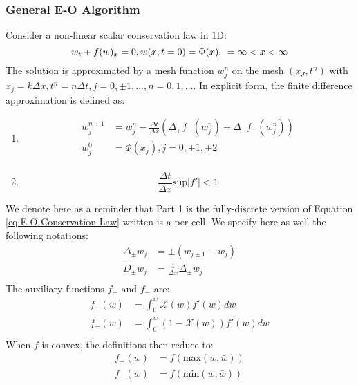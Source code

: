 \documentclass[a4paper]{article}
\numberwithin{equation}{section}
\begin{document}
\subsubsection{General E-O Algorithm}
Consider a non-linear scalar conservation law in 1D:
\begin{equation} 
    w_t + f(w)_x = 0,\\ w(x,t=0) = \Phi(x). \ =\infty < x< \infty
\end{equation}
The solution is approximated by a mesh function $w_j^n$ on the mesh ${(x_J,t^n)}$ with $x_j = k \Delta x, t^n = n \Delta t, j = 0, \pm 1,...,n=0,1,...$. In explicit form, the finite difference approximation is defined as:
\begin{enumerate}
    \item 
\begin{equation} \label{eq:E-O Conservation Law}
    \begin{split}
        w_j^{n+1} &= w_j^n - \frac{\Delta t}{\Delta x}\left(\Delta_{+} f_{-} (w_j^n) + \Delta_{-} f_{+} (w_j^n) \right) \\
        w_j^0 &= \Phi(x_j), j = 0, \pm 1, \pm 2\\
    \end{split}
\end{equation}
    \item
        \begin{equation}
            \frac{\Delta t}{\Delta x} \text{sup} |f'| < 1
        \end{equation}

\end{enumerate}
We denote here as a reminder that Part 1 is the fully-discrete version of Equation \ref{eq:E-O Conservation Law} written is a per cell. We specify here as well the following notations:
\begin{equation}
    \begin{split}
        \Delta_{\pm} w_j &= \pm (w_{j\pm 1} - w_j)\\
        D_{\pm} w_j &= \frac{1}{\Delta x} \Delta_{\pm} w_j\\
    \end{split} 
\end{equation}
The auxiliary functions $f_+$ and $f_-$ are:
\begin{equation}
    \begin{split}
        f_+ (w) &= \int_0^w \mathcal{X} (w) f'(w) dw\\
        f_- (w) &= \int_0^w (1 - \mathcal{X}(w)) f'(w)dw\\
    \end{split}
\end{equation}
When $f$ is convex, the definitions then reduce to:
\begin{equation}
    \begin{split}
        f_+ (w) &= f(\mathrm{max}(w,\bar{w}))\\
        f_- (w) &= f(\mathrm{min}(w,\bar{w})) \\
    \end{split}
\end{equation}
\end{document}
